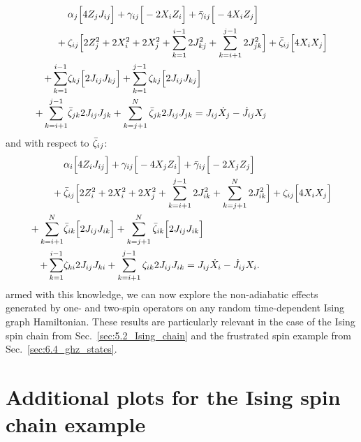 \documentclass[a4paper,oneside,11pt]{book}
\newcommand{\gammabar}{\Bar{\gamma}}
\newcommand{\zetabar}{\Bar{\zeta}}
\begin{document}
\begin{equation}\label{eq:ising_graph_minimise_zeta}
    \begin{aligned}
        &\alpha_j\Big[ 4 Z_j J_{ij} \Big] + \gamma_{ij}\Big[ - 2 X_i Z_i\Big] + \gammabar_{ij} \Big[ - 4 X_i Z_j \Big] \\
        + \: &\zeta_{ij} \Big[ 2 Z_j^2 + 2X_i^2 + 2X_j^2 + \sum_{k = 1}^{i-1} 2 J_{kj}^2 + \sum_{k = i+1}^{j-1} 2 J_{jk}^2 \Big] + \zetabar_{ij}\Big[ 4 X_i X_j \Big] \\
        + \sum_{k = 1}^{i-1} &\zeta_{kj}\Big[ 2 J_{ij} J_{kj} \Big] + \sum_{k = 1}^{j-1} \zeta_{kj} \Big[2 J_{ij}J_{kj}\Big] \\
        + \sum_{k = i +1}^{j-1} &\zetabar_{jk} 2 J_{ij} J_{jk} + \sum_{k = j +1}^N \zetabar_{jk} 2 J_{ij} J_{jk} = J_{ij} \dot{X}_j - \dot{J}_{ij} X_j
    \end{aligned}
\end{equation}
and with respect to $\zetabar_{ij}$:
\begin{equation}\label{eq:ising_graph_minimise_zetabar}
    \begin{aligned}
        &\alpha_i\Big[ 4 Z_i J_{ij} \Big] + \gamma_{ij}\Big[ - 4 X_j Z_i\Big] + \gammabar_{ij} \Big[ - 2 X_j Z_j \Big] \\
        + \: &\zetabar_{ij} \Big[ 2 Z_i^2 + 2X_i^2 + 2X_j^2 + \sum_{k = i+1}^{j-1} 2 J_{ik}^2 + \sum_{k = j+1}^N 2 J_{ik}^2 \Big] + \zeta_{ij}\Big[ 4 X_i X_j \Big] \\
        + \sum_{k = i+1}^N &\zetabar_{ik}\Big[ 2 J_{ij} J_{ik} \Big] + \sum_{k = j+1}^N \zetabar_{ik} \Big[2 J_{ij}J_{ik}\Big] \\
        + \sum_{k = 1}^{i-1} &\zeta_{ki} 2 J_{ij} J_{ki} + \sum_{k = i+1}^{j-1} \zeta_{ik} 2 J_{ij} J_{ik} = J_{ij} \dot{X}_i - \dot{J}_{ij} X_i.
    \end{aligned}
\end{equation}
armed with this knowledge, we can now explore the non-adiabatic effects generated by one- and two-spin operators on any random time-dependent Ising graph Hamiltonian. These results are particularly relevant in the case of the Ising spin chain from Sec.~\ref{sec:5.2_Ising_chain} and the frustrated spin example from Sec.~\ref{sec:6.4_ghz_states}.

\chapter{Additional plots for the Ising spin chain example}\label{app:ising}
\end{document}
